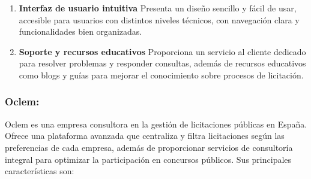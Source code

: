 \documentclass{article}
\begin{document}
\begin{enumerate}
\item \textbf{Interfaz de usuario intuitiva}  
\newline
Presenta un diseño sencillo y fácil de usar, accesible para usuarios con distintos niveles técnicos, con navegación clara y funcionalidades bien organizadas.

\item \textbf{Soporte y recursos educativos}  
\newline
Proporciona un servicio al cliente dedicado para resolver problemas y responder consultas, además de recursos educativos como blogs y guías para mejorar el conocimiento sobre procesos de licitación.
\end{enumerate}

  \subsubsection{Oclem:} 
  Oclem es una empresa consultora en la gestión de licitaciones públicas en España. Ofrece una plataforma avanzada que centraliza y filtra licitaciones según las preferencias de cada empresa, además de proporcionar servicios de consultoría integral para optimizar la participación en concursos públicos. Sus principales características son: 
\end{document}
